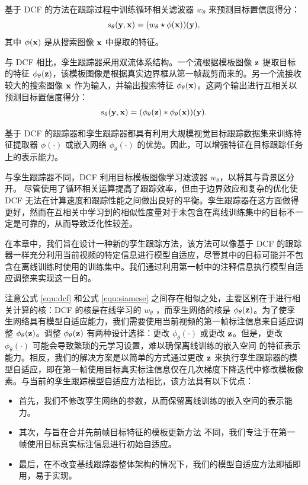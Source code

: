 基于 DCF 的方法在跟踪过程中训练循环相关滤波器 $w_{\theta}$ 来预测目标置信度得分：
\begin{equation}
    s_\theta(\textbf y,\textbf x)=(w_\theta \star \phi(\textbf x))(\textbf y),
    \label{equ:dcf}
\end{equation}
其中 $\phi(\textbf x)$ 是从搜索图像 $\textbf x$ 中提取的特征。

与 DCF 相比，孪生跟踪器采用双流体系结构。一个流根据模板图像 $\textbf z$ 提取目标的特征 $\phi_\theta(\textbf z)$，该模板图像是根据真实边界框从第一帧裁剪而来的。另一个流接收较大的搜索图像 $\textbf x$ 作为输入，并输出搜索特征 $\phi_\theta(\textbf x)$。这两个输出进行互相关以预测目标置信度得分：
\begin{equation}
    s_\theta(\textbf y,\textbf x)=(\phi_\theta(\textbf z) * \phi_\theta(\textbf x))(\textbf y).
    \label{equ:siamese}
\end{equation}

基于 DCF 的跟踪器和孪生跟踪器都具有利用大规模视觉目标跟踪数据集来训练特征提取器 $\phi(\cdot)$ 或嵌入网络 $\phi_{\theta}(\cdot)$ 的优势。因此，可以增强特征在目标跟踪任务上的表示能力。

与孪生跟踪器不同，DCF 利用目标模板图像学习滤波器 $w_\theta$，以将其与背景区分开。
尽管使用了循环相关运算提高了跟踪效率，但由于边界效应和复杂的优化使 DCF 无法在计算速度和跟踪性能之间做出良好的平衡。孪生跟踪器在这方面做得更好，然而在互相关中学习到的相似性度量对于未包含在离线训练集中的目标不一定是可靠的，从而导致泛化性较差。

在本章中，我们旨在设计一种新的孪生跟踪方法，该方法可以像基于 DCF 的跟踪器一样充分利用当前视频的特定信息进行模型自适应，尽管其中的目标可能并不包含在离线训练时使用的训练集中。我们通过利用第一帧中的注释信息执行模型自适应调整来实现这一目的。

注意公式 \ref{equ:dcf} 和公式 \ref{equ:siamese} 之间存在相似之处，主要区别在于进行相关计算的核：DCF 的核是在线学习的 $w_{\theta}$ ，而孪生网络的核是 $\phi_\theta(\textbf z)$。为了使孪生网络具有模型自适应能力，我们需要使用当前视频的第一帧标注信息来自适应调整 $\phi_\theta(\textbf z)$。调整 $\phi_\theta(\textbf z)$ 有两种设计选择：更改 $\phi_\theta(\cdot)$ 或更改 $\textbf z$。但是，更改 $\phi_\theta(\cdot)$ 可能会导致繁琐的元学习设置，难以确保离线训练的嵌入空间 \cite{ROAM, DBLP:conf/aaai/JungYNCH20} 的特征表示能力。相反，我们的解决方案是以简单的方式通过更改 $\textbf z$ 来执行孪生跟踪器的模型自适应，即在第一帧使用目标真实标注信息仅在几次梯度下降迭代中修改模板像素。与当前的孪生跟踪模型自适应方法相比，该方法具有以下优点：

\begin{itemize}
\item 首先，我们不修改孪生网络的参数，从而保留离线训练的嵌入空间的表示能力。
\item 其次，与旨在合并先前帧目标特征的模板更新方法 \cite{zhu2018distractor, Zhang_2019_ICCV} 不同，我们专注于在第一帧使用目标真实标注信息进行初始自适应。
\item 最后，在不改变基线跟踪器整体架构的情况下，我们的模型自适应方法即插即用，易于实现。
\end{itemize}

